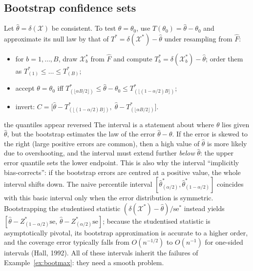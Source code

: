 \documentclass[11pt,a4paper]{article}
\begin{document}
\subsection{Bootstrap confidence sets}\label{sec:bootci}

Let $\hat\theta=\delta(\mathcal X)$ be consistent. To test $\theta=\theta_0$, use $T(\theta_0)=\hat\theta-\theta_0$ and approximate its null law by that of $T^*=\delta(\mathcal X^*)-\hat\theta$ under resampling from $\hat F$:
\begin{itemize}
\item for $b=1,\ldots,B$, draw $\mathcal X^*_b$ from $\hat F$ and compute $T_b^*=\delta(\mathcal X_b^*)-\hat\theta$; order them as $T^*_{(1)}\le\dots\le T^*_{(B)}$;
\item accept $\theta=\theta_0$ iff $T^*_{(\lfloor\alpha B/2\rfloor)}\le\hat\theta-\theta_0\le T^*_{(\lfloor(1-\alpha/2)B\rfloor)}$;
\item invert: $C=\big[\hat\theta-T^*_{(\lfloor(1-\alpha/2)B\rfloor)},\;\hat\theta-T^*_{(\lfloor\alpha B/2\rfloor)}\big]$.
\end{itemize}

\begin{whybox}{the quantiles appear reversed}
The interval is a statement about where $\theta$ lies given $\hat\theta$, but the bootstrap estimates the law of the error $\hat\theta-\theta$. If the error is skewed to the right (large positive errors are common), then a high value of $\hat\theta$ is more likely due to overshooting, and the interval must extend further \emph{below} $\hat\theta$: the upper error quantile sets the lower endpoint. This is also why the interval ``implicitly bias-corrects'': if the bootstrap errors are centred at a positive value, the whole interval shifts down. The naive percentile interval $[\hat\theta^*_{(\alpha/2)},\hat\theta^*_{(1-\alpha/2)}]$ coincides with this basic interval only when the error distribution is symmetric. Bootstrapping the studentised statistic $(\delta(\mathcal X^*)-\hat\theta)/\mathrm{se}^*$ instead yields $[\hat\theta-Z^*_{(1-\alpha/2)}\mathrm{se},\,\hat\theta-Z^*_{(\alpha/2)}\mathrm{se}]$; because the studentised statistic is asymptotically pivotal, its bootstrap approximation is accurate to a higher order, and the coverage error typically falls from $O(n^{-1/2})$ to $O(n^{-1})$ for one-sided intervals (Hall, 1992). All of these intervals inherit the failures of Example~\ref{ex:bootmax}: they need a smooth problem.
\end{whybox}

\end{document}
